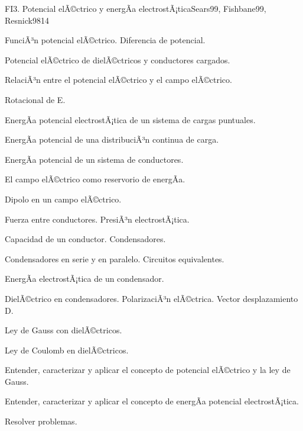\begin{syllabus}
\begin{unit}{FI3. Potencial elÃ©ctrico y energÃ­a electrostÃ¡tica}{Sears99, Fishbane99, Resnick98}{14}
   \begin{topics}
         \item  FunciÃ³n potencial elÃ©ctrico. Diferencia de potencial.
	 \item  Potencial elÃ©ctrico de dielÃ©ctricos y conductores cargados.
         \item  RelaciÃ³n entre el potencial elÃ©ctrico y el campo elÃ©ctrico.
	 \item  Rotacional de E.
         \item  EnergÃ­a potencial electrostÃ¡tica de un sistema de cargas puntuales.
	 \item  EnergÃ­a potencial de una distribuciÃ³n continua de carga.
         \item  EnergÃ­a potencial de un sistema de conductores.
	 \item  El campo elÃ©ctrico como reservorio de energÃ­a.
         \item  Dipolo en un campo elÃ©ctrico.
         \item  Fuerza entre conductores.  PresiÃ³n electrostÃ¡tica.
         \item  Capacidad de un conductor. Condensadores.
         \item  Condensadores en serie y en paralelo.  Circuitos equivalentes.
         \item  EnergÃ­a electrostÃ¡tica de un condensador.
         \item  DielÃ©ctrico en condensadores.  PolarizaciÃ³n elÃ©ctrica.  Vector desplazamiento D.
         \item  Ley de Gauss con dielÃ©ctricos.
         \item  Ley de Coulomb en dielÃ©ctricos.
   \end{topics}

   \begin{unitgoals}
         \item  Entender, caracterizar y aplicar el concepto de potencial elÃ©ctrico y la ley de Gauss.
         \item  Entender, caracterizar y aplicar el concepto de energÃ­a potencial electrostÃ¡tica.
         \item  Resolver problemas.
   \end{unitgoals}
\end{unit}


\end{syllabus}
